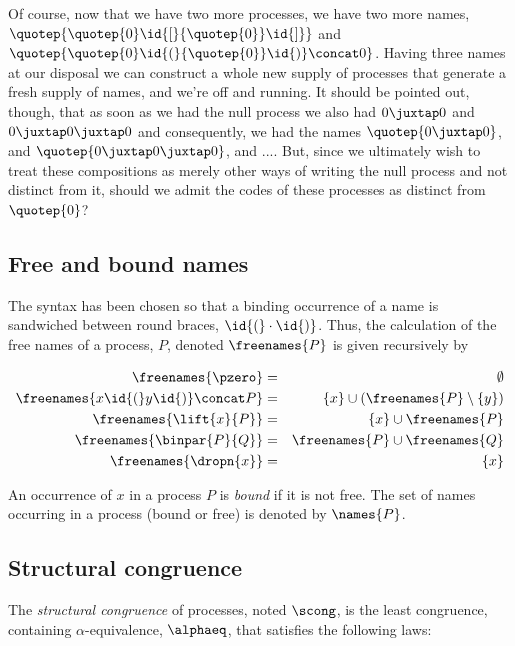 Of course, now that we have two more processes, we have two more
names, $\quotep{\quotep{0}\id{[}{\quotep{0}}\id{]}}$ and
$\quotep{\quotep{0}\id{(}{\quotep{0}}\id{)} \concat 0}$. Having three
names at our disposal we can construct a whole new supply of processes
that generate a fresh supply of names, and we're off and running. It
should be pointed out, though, that as soon as we had the null process
we also had $0 \juxtap 0$ and $0 \juxtap 0 \juxtap 0$ and
consequently, we had the names $\quotep{ 0 \juxtap 0 }$, and $\quotep{
0 \juxtap 0 \juxtap 0}$, and .... But, since we ultimately wish to
treat these compositions as merely other ways of writing the null
process and not distinct from it, should we admit the codes of these
processes as distinct from $\quotep{0}$?

\subsection{Free and bound names}

The syntax has been chosen so that a binding occurrence of a name is
sandwiched between round braces, $\id{(} \cdot \id{)}$. Thus, the
calculation of the free names of a process, $P$, denoted
$\freenames{P}$ is given recursively by


\begin{eqnarray}
  \freenames{\pzero} & = & \emptyset \nonumber\\
  \freenames{x \id{(}y\id{)} \concat P} & = & \{ x \} \cup (\freenames{P} \setminus \{ y \}) \nonumber\\
  \freenames{\lift{x}{P}} & = & \{ x \} \cup \freenames{P} \nonumber\\
  \freenames{\binpar{P}{Q}} & = & \freenames{P} \cup \freenames{Q} \nonumber\\
  \freenames{\dropn{x}} & = & \{ x \} \nonumber
\end{eqnarray}

An occurrence of $x$ in a process $P$ is \textit{bound} if it is not
free. The set of names occurring in a process (bound or free) is
denoted by $\names{P}$.

\subsection{Structural congruence}

The {\em structural congruence} of processes, noted $\scong$, is the
least congruence, containing $\alpha$-equivalence, $\alphaeq$, that
satisfies the following laws:

